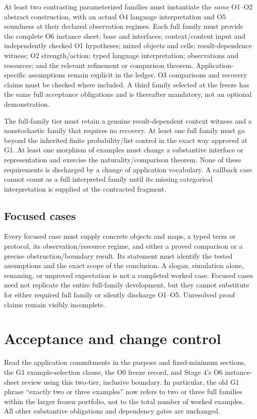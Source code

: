 \documentclass[11pt,a4paper]{article}
\begin{document}
At least two contrasting parameterized families must instantiate the
\emph{same} O1--O2 abstract construction, with an actual O4 language
interpretation and O5 soundness at their declared observation regimes.
Each full family must provide the complete O6 instance sheet: base and
interfaces; context/content input and independently checked O1 hypotheses;
mixed objects and cells; result-dependence witness; O2 strength/action;
typed language interpretation; observations and resources; and the relevant
refinement or comparison theorem. Application-specific assumptions remain
explicit in the ledger. O3 comparisons and recovery claims must be checked
where included. A third family selected at the freeze has the same full
acceptance obligations and is thereafter mandatory, not an optional
demonstration.

The full-family tier must retain a genuine result-dependent context witness
and a nonstochastic family that requires no recovery. At least one full family
must go beyond the inherited finite probability/list control in the exact
way approved at G1. At least one morphism of examples must change a
substantive interface or representation and exercise the
naturality/comparison theorem. None of these requirements is discharged by
a change of application vocabulary. A callback case cannot count as a full
interpreted family until its missing categorical interpretation is supplied
at the contracted fragment.

\subsection{Focused cases}

Every focused case must supply concrete objects and maps, a typed term or
protocol, its observation/resource regime, and either a proved comparison
or a precise obstruction/boundary result. Its statement must identify the
tested assumptions and the exact scope of the conclusion. A slogan,
simulation alone, renaming, or unproved expectation is not a completed
worked case. Focused cases need not replicate the entire full-family
development, but they cannot substitute for either required full family or
silently discharge O1--O5. Unresolved proof claims remain visibly incomplete.

\section{Acceptance and change control}

Read the application commitments in the purpose and fixed-minimum sections,
the G1 example-selection clause, the O0 freeze record, and Stage 4's O6
instance-sheet review using this two-tier, inclusive boundary. In particular,
the old G1 phrase ``exactly two or three examples'' now refers to two or
three full families within the larger frozen portfolio, not to the total
number of worked examples. All other substantive obligations and dependency
gates are unchanged.
\end{document}
